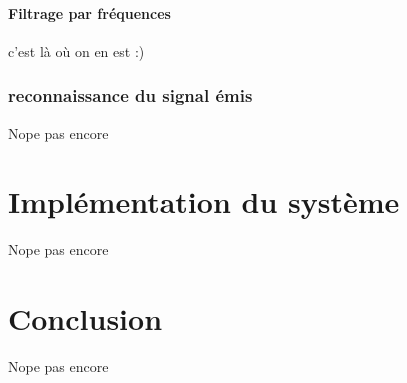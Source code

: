 \documentclass[12pt,a4paper]{report}
\begin{document}
\subsubsection{Filtrage par fréquences}
c'est là où on en est :) 

\subsection{reconnaissance du signal émis}
Nope pas encore %

\chapter{Implémentation du système}
Nope pas encore %

\chapter{Conclusion}
Nope pas encore %

\begin{appendices}

\end{appendices}



\end{document}
